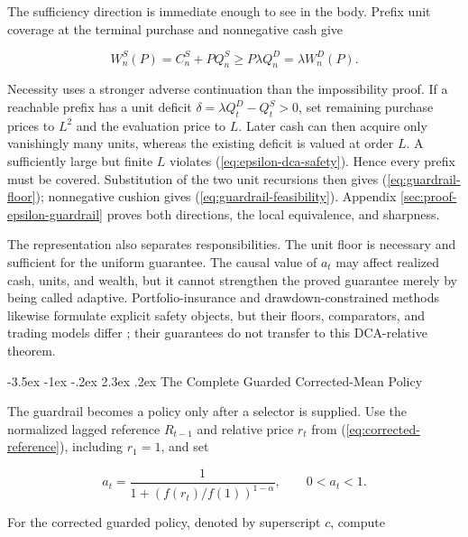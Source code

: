 \documentclass[12pt,a4paper,oneside]{report}
\makeatletter
\renewcommand\section{\@startsection{section}{1}{\z@}%
  {-3.5ex \@plus -1ex \@minus -.2ex}%
  {2.3ex \@plus .2ex}%
  {\normalfont\fontsize{14}{17}\selectfont\bfseries}}
\makeatother
\begin{document}
The sufficiency direction is immediate enough to see in the body. Prefix unit
coverage at the terminal purchase and nonnegative cash give

\begin{equation}
  W_n^S(P)=C_n^S+P Q_n^S
  \geq P\lambda Q_n^D=\lambda W_n^D(P).
  \label{eq:guardrail-sufficiency}
\end{equation}

Necessity uses a stronger adverse continuation than the impossibility proof.
If a reachable prefix has a unit deficit
$\delta=\lambda Q_t^D-Q_t^S>0$, set remaining purchase prices to $L^2$ and the
evaluation price to $L$. Later cash can then acquire only vanishingly many
units, whereas the existing deficit is valued at order $L$. A sufficiently
large but finite $L$ violates (\ref{eq:epsilon-dca-safety}). Hence every prefix
must be covered. Substitution of the two unit recursions then gives
(\ref{eq:guardrail-floor}); nonnegative cushion gives
(\ref{eq:guardrail-feasibility}). Appendix
\ref{sec:proof-epsilon-guardrail} proves both directions, the local
equivalence, and sharpness.

The representation also separates responsibilities. The unit floor is
necessary and sufficient for the uniform guarantee. The causal value of
$a_t$ may affect realized cash, units, and wealth, but it cannot strengthen the
proved guarantee merely by being called adaptive. Portfolio-insurance and
drawdown-constrained methods likewise formulate explicit safety objects, but
their floors, comparators, and trading models differ
\citep{blackperold1992,grossmanzhou1993,conttankov2009}; their guarantees do
not transfer to this DCA-relative theorem.

\section{The Complete Guarded Corrected-Mean Policy}
\label{def:guarded-policy}

The guardrail becomes a policy only after a selector is supplied. Use the
normalized lagged reference $R_{t-1}$ and relative price $r_t$ from
(\ref{eq:corrected-reference}), including $r_1=1$, and set

\begin{equation}
  a_t=\frac{1}{1+\left(f(r_t)/f(1)\right)^{1-\alpha}},
  \qquad 0<a_t<1.
  \label{eq:guarded-policy-score}
\end{equation}

For the corrected guarded policy, denoted by superscript $c$, compute
\end{document}
